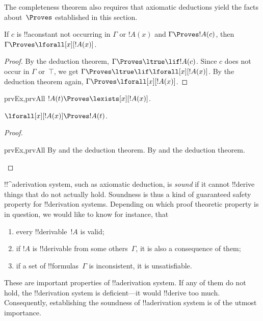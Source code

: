   



\begin{explain}
  The completeness theorem also requires that axiomatic deductions
  yield the facts about~$\Proves$ established in this section.
\end{explain}

\begin{thm}
 If $c$ is !!a{constant} not occurring
in $\Gamma$ or $!A(x)$ and $\Gamma \Proves !A(c)$, then $\Gamma
\Proves \lforall[x][!A(x)]$.
\end{thm}

\begin{proof}
By the deduction theorem, $\Gamma \Proves \ltrue \lif !A(c)$. Since
$c$ does not occur in $\Gamma$ or~$\top$, we get $\Gamma \Proves
\ltrue \lif \lforall[x][!A(x)]$. By the deduction theorem again, $\Gamma \Proves
\lforall[x][!A(x)]$.
\end{proof}

\begin{prop}
\begin{tagenumerate}{prvEx,prvAll}
$!A(t) \Proves \lexists[x][!A(x)]$.

$\lforall[x][!A(x)] \Proves !A(t)$.
\end{tagenumerate}
\end{prop}

\begin{proof}
\begin{tagenumerate}{prvEx,prvAll}
By  and the deduction theorem.
By  and the deduction theorem.
\end{tagenumerate}
\end{proof}






      

\begin{explain}
!!^a{derivation} system, such as axiomatic deduction, is \emph{sound}
if it cannot !!{derive} things that do not actually hold.  Soundness is
thus a kind of guaranteed safety property for !!{derivation} systems.
Depending on which proof theoretic property is in question, we would
like to know for instance, that
\begin{enumerate}
\item every !!{derivable}~$!A$ is valid;
\item if $!A$ is !!{derivable} from some others~$\Gamma$, it is also a
  consequence of them;
\item if a set of !!{formula}s~$\Gamma$ is inconsistent, it is
  unsatisfiable.
\end{enumerate}
These are important properties of !!a{derivation} system.  If any of them do
not hold, the !!{derivation} system is deficient---it would !!{derive} too much.
Consequently, establishing the soundness of !!a{derivation} system is of the
utmost importance.
\end{explain}

